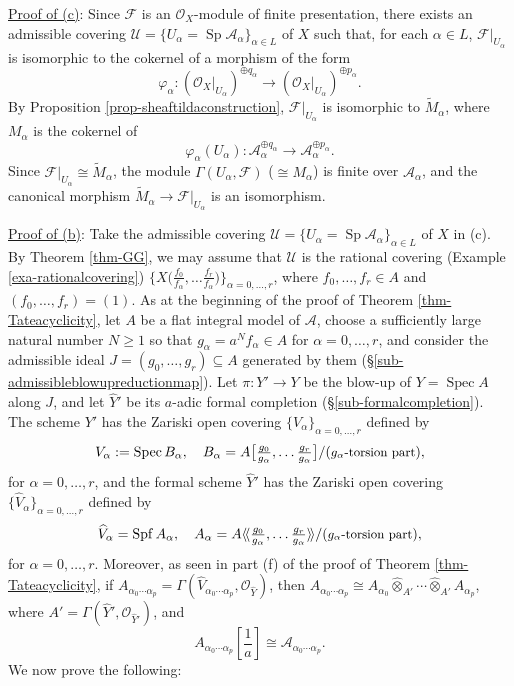 \documentclass[a4paper,12pt, dvipdfmx]{jsbook}
\def\O{\mathscr{O}}
\def\til#1{\widetilde{#1}}%
\def\Spec{\mathop{\mathrm{Spec}}\nolimits}
\def\Spf{\mathop{\mathrm{Spf}}\nolimits}
\def\Sp{\mathop{\mathrm{Sp}}\nolimits}
\def\dl{\langle\!\langle}
\def\dr{\rangle\!\rangle}
\theoremstyle{plain}
\theoremstyle{definition}
\begin{document}
\medskip\noindent
\underline{Proof of (c)}: Since $\mathscr{F}$ is an $\O_X$-module of finite presentation, there exists an admissible covering $\mathcal{U}=\{U_{\alpha}=\Sp\mathcal{A}_{\alpha}\}_{\alpha\in L}$ of $X$ such that, for each $\alpha\in L$, $\mathscr{F}|_{U_{\alpha}}$ is isomorphic to the cokernel of a morphism of the form
$$
\varphi_{\alpha}\colon(\O_X|_{U_{\alpha}})^{\oplus q_{\alpha}}\longrightarrow(\O_X|_{U_{\alpha}})^{\oplus p_{\alpha}}.
$$
By Proposition \ref{prop-sheaftildaconstruction}, $\mathscr{F}|_{U_{\alpha}}$ is isomorphic to $\til{M}_{\alpha}$, where $M_{\alpha}$ is the cokernel of
$$
\varphi_{\alpha}(U_{\alpha})\colon\mathcal{A}^{\oplus q_{\alpha}}_{\alpha}\longrightarrow\mathcal{A}^{\oplus p_{\alpha}}_{\alpha}.
$$
Since $\mathscr{F}|_{U_{\alpha}}\cong\til{M}_{\alpha}$, the module $\Gamma(U_{\alpha},\mathscr{F})$ ($\cong M_{\alpha}$) is finite over $\mathcal{A}_{\alpha}$, and the canonical morphism $\til{M}_{\alpha}\rightarrow\mathscr{F}|_{U_{\alpha}}$ is an isomorphism.

\medskip\noindent
\underline{Proof of (b)}: Take the admissible covering $\mathcal{U}=\{U_{\alpha}=\Sp\mathcal{A}_{\alpha}\}_{\alpha\in L}$ of $X$ in (c).
By Theorem \ref{thm-GG}, we may assume that $\mathcal{U}$ is the rational covering (Example \ref{exa-rationalcovering}) $\big\{X\big({\textstyle \frac{f_0}{f_{\alpha}},\ldots\frac{f_r}{f_{\alpha}}}\big)\big\}_{\alpha=0,\ldots,r}$, where $f_0,\ldots,f_r\in A$ and $(f_0,\ldots,f_r)=(1)$.
As at the beginning of the proof of Theorem \ref{thm-Tateacyclicity}, let $A$ be a flat integral model of $\mathcal{A}$, choose a sufficiently large natural number $N\geq 1$ so that $g_{\alpha}=a^Nf_{\alpha}\in A$ for $\alpha=0,\ldots,r$, and consider the admissible ideal $J=(g_0,\ldots,g_r)\subseteq A$ generated by them (\S\ref{sub-admissibleblowupreductionmap}).
Let $\pi\colon Y'\rightarrow Y$ be the blow-up of $Y=\Spec A$ along $J$, and let $\widehat{Y}'$ be its $a$-adic formal completion (\S\ref{sub-formalcompletion}).
The scheme $Y'$ has the Zariski open covering $\{V_{\alpha}\}_{\alpha=0,\ldots,r}$ defined by
$$
V_{\alpha}:=\Spec B_{\alpha},\quad B_{\alpha}=A\big[{\textstyle \frac{g_0}{g_{\alpha}},\ldots\frac{g_r}{g_{\alpha}}}\big]/(\textrm{{\small $g_{\alpha}$-torsion part}}),
$$
for $\alpha=0,\ldots,r$, and the formal scheme $\widehat{Y}'$ has the Zariski open covering $\{\widehat{V}_{\alpha}\}_{\alpha=0,\ldots,r}$ defined by
$$
\widehat{V}_{\alpha}=\Spf A_{\alpha},\quad A_{\alpha}=A\dl{\textstyle \frac{g_0}{g_{\alpha}},\ldots\frac{g_r}{g_{\alpha}}}\dr/(\textrm{{\small $g_{\alpha}$-torsion part}}),
$$
for $\alpha=0,\ldots,r$.
Moreover, as seen in part (f) of the proof of Theorem \ref{thm-Tateacyclicity}, if $A_{\alpha_0\cdots\alpha_p}=\Gamma(\widehat{V}_{\alpha_0\cdots\alpha_p},\O_{\widehat{Y}})$, then $A_{\alpha_0\cdots\alpha_p}\cong A_{\alpha_0}\widehat{\otimes}_{A'}\cdots\widehat{\otimes}_{A'}A_{\alpha_p}$, where $A'=\Gamma(\widehat{Y}',\O_{\widehat{Y}'})$, and
$$
{\textstyle A_{\alpha_0\cdots\alpha_p}[\frac{1}{a}]\cong\mathcal{A}_{\alpha_0\cdots\alpha_p}}.
$$
We now prove the following:
\end{document}
